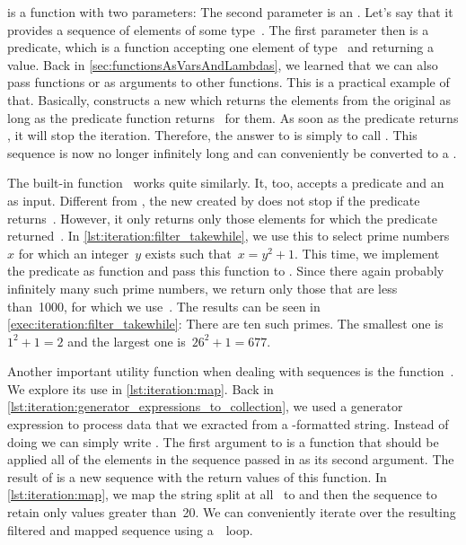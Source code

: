  is a function with two parameters:
The second parameter is an .
Let's say that it provides a sequence of elements of some type~.
The first parameter then is a predicate, which is a function accepting one element of type~ and returning a  value.
Back in \cref{sec:functionsAsVarsAndLambdas}, we learned that we can also pass functions or  as arguments to other functions.
This is a practical example of that.
Basically,  constructs a new  which returns the elements from the original  as long as the predicate function returns~ for them.
As soon as the predicate returns , it will stop the iteration.
Therefore, the answer to  is simply to call .
This sequence is now no longer infinitely long and can conveniently be converted to a .

The built-in function~ works quite similarly.
It, too, accepts a predicate and an~ as input.
Different from , the new  created by  does not stop if the predicate returns~.
However, it only returns only those elements for which the predicate returned~.
In \cref{lst:iteration:filter_takewhile}, we use this to select prime numbers~$x$ for which an integer~$y$ exists such that~$x=y^2+1$.
This time, we implement the predicate as function  and pass this function to .
Since there again probably infinitely many such prime numbers, we return only those that are less than~1000, for which we use~.
The results can be seen in \cref{exec:iteration:filter_takewhile}:
There are ten such primes.
The smallest one is $1^2+1=2$ and the largest one is~$26^2+1=677$.

%
%
%
Another important utility function when dealing with sequences is the function~.
We explore its use in \cref{lst:iteration:map}.
Back in \cref{lst:iteration:generator_expressions_to_collection}, we used a generator expression to process data that we exracted from a -formatted string.
Instead of doing  we can simply write .
The first argument to  is a function that should be applied all of the elements in the sequence passed in as its second argument.
The result of  is a new sequence with the return values of this function.
In \cref{lst:iteration:map}, we map the string  split at all~\pythonil{\",\"} to  and then  the sequence to retain only values greater than~20.
We can conveniently iterate over the resulting filtered and mapped sequence using a~~loop.

